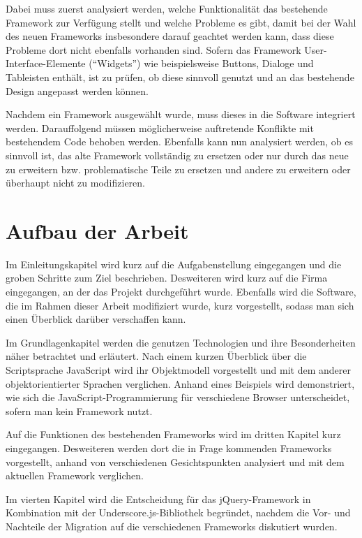 Dabei muss zuerst analysiert werden, welche Funktionalität das bestehende Framework zur Verfügung
stellt und welche Probleme es gibt, damit bei der Wahl des neuen Frameworks insbesondere darauf
geachtet werden kann, dass diese Probleme dort nicht ebenfalls vorhanden sind. Sofern das Framework
User-Interface-Elemente (\enquote{Widgets}) wie beispielsweise Buttons, Dialoge und Tableisten
enthält, ist zu prüfen, ob diese sinnvoll genutzt und an das bestehende Design angepasst werden können.

Nachdem ein Framework ausgewählt wurde, muss dieses in die Software integriert werden. Darauffolgend
müssen möglicherweise auftretende Konflikte mit bestehendem Code behoben werden.
Ebenfalls kann nun analysiert werden, ob es sinnvoll ist, das alte Framework vollständig zu ersetzen
oder nur durch das neue zu erweitern bzw. problematische Teile zu ersetzen und andere zu erweitern
oder überhaupt nicht zu modifizieren.


\section{Aufbau der Arbeit}

Im Einleitungskapitel wird kurz auf die Aufgabenstellung eingegangen und die groben Schritte zum
Ziel beschrieben. Desweiteren wird kurz auf die Firma eingegangen, an der das Projekt durchgeführt
wurde.
Ebenfalls wird die Software, die im Rahmen dieser Arbeit modifiziert wurde, kurz vorgestellt, sodass
man sich einen Überblick darüber verschaffen kann.

Im Grundlagenkapitel werden die genutzen Technologien und ihre Besonderheiten näher betrachtet und
erläutert. Nach einem kurzen Überblick über die Scriptsprache JavaScript wird ihr Objektmodell
vorgestellt und mit dem anderer objektorientierter Sprachen verglichen. Anhand eines Beispiels wird
demonstriert, wie sich die JavaScript-Programmierung für verschiedene Browser unterscheidet,
sofern man kein Framework nutzt.

Auf die Funktionen des bestehenden Frameworks wird im dritten Kapitel kurz eingegangen. Desweiteren
werden dort die in Frage kommenden Frameworks vorgestellt, anhand von verschiedenen Gesichtspunkten
analysiert und mit dem aktuellen Framework verglichen.

Im vierten Kapitel wird die Entscheidung für das jQuery-Framework in Kombination mit der
Underscore.js-Bibliothek begründet, nachdem die Vor- und Nachteile der Migration auf die
verschiedenen Frameworks diskutiert wurden.

